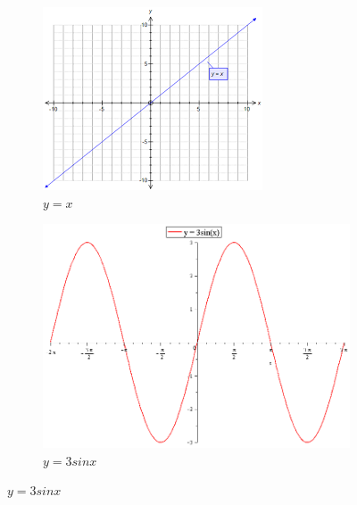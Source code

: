 \begin{figure}
     \centering
     \begin{subfigure}[b]{0.3\textwidth}
         \centering
         \includegraphics[width=\textwidth]{assets/pics/graph1.png}
         \caption{$y=x$}
         \label{fig:y equals x}
     \end{subfigure}
     \hfill
     \begin{subfigure}[b]{0.3\textwidth}
         \centering
         \includegraphics[width=\textwidth]{assets/pics/graph2.png}
         \caption{$y=3sinx$}
         \label{fig:three sin x}
     \end{subfigure}
     \hfill

\end{figure}
